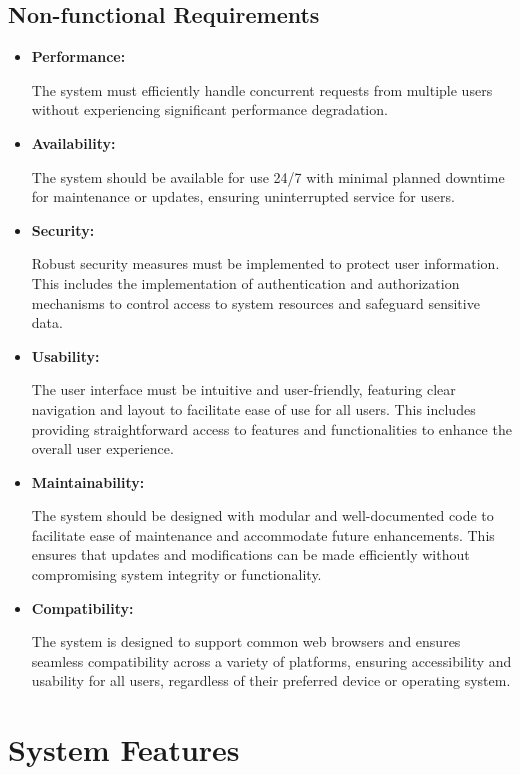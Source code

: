 \documentclass{article}
\begin{document}
\subsection{Non-functional Requirements}
\begin{itemize}
\item\textbf{Performance:}

The system must efficiently handle concurrent requests from multiple users without experiencing significant performance degradation. 

\item\textbf{Availability:}

The system should be available for use 24/7 with minimal planned downtime for maintenance or updates, ensuring uninterrupted service for users. 

\item\textbf{Security:}

Robust security measures must be implemented to protect user information. This includes the implementation of authentication and authorization mechanisms to control access to system resources and safeguard sensitive data. 

\item\textbf{Usability:}

The user interface must be intuitive and user-friendly, featuring clear navigation and layout to facilitate ease of use for all users. This includes providing straightforward access to features and functionalities to enhance the overall user experience. 

\item\textbf{Maintainability:}

The system should be designed with modular and well-documented code to facilitate ease of maintenance and accommodate future enhancements. This ensures that updates and modifications can be made efficiently without compromising system integrity or functionality. 

\item\textbf{Compatibility:}

The system is designed to support common web browsers and ensures seamless compatibility across a variety of platforms, ensuring accessibility and usability for all users, regardless of their preferred device or operating system.  
\end{itemize}

\section{System Features}
\end{document}
